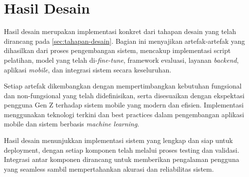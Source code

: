 \section{Hasil Desain}
\label{sec:hasil-desain}

Hasil desain merupakan implementasi konkret dari tahapan desain yang telah dirancang pada \autoref{sec:tahapan-desain}. Bagian ini menyajikan artefak-artefak yang dihasilkan dari proses pengembangan sistem, mencakup implementasi script pelatihan, model yang telah di-\emph{fine-tune}, framework evaluasi, layanan \emph{backend}, aplikasi \emph{mobile}, dan integrasi sistem secara keseluruhan.

Setiap artefak dikembangkan dengan mempertimbangkan kebutuhan fungsional dan non-fungsional yang telah didefinisikan, serta disesuaikan dengan ekspektasi pengguna Gen Z terhadap sistem mobile yang modern dan efisien. Implementasi menggunakan teknologi terkini dan best practices dalam pengembangan aplikasi mobile dan sistem berbasis \emph{machine learning}.


Hasil desain menunjukkan implementasi sistem yang lengkap dan siap untuk deployment, dengan setiap komponen telah melalui proses testing dan validasi. Integrasi antar komponen dirancang untuk memberikan pengalaman pengguna yang seamless sambil mempertahankan akurasi dan reliabilitas sistem.





